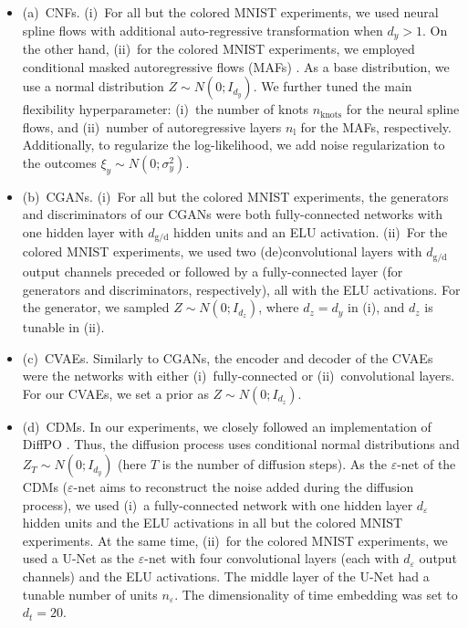 \documentclass[dvipsnames]{article} %
\begin{document}
\begin{itemize}
    \item (a)~CNFs. (i)~For all but the colored MNIST experiments, we used neural spline flows \citep{durkan2019neural} with additional auto-regressive transformation \citep{huang2018neural} when $d_y > 1$. {On the other hand, (ii)~for the colored MNIST experiments, we employed conditional masked autoregressive flows (MAFs) \citep{germain2015made,papamakarios2017masked}.} As a base distribution, we use a normal distribution $Z \sim N(0; I_{d_y})$. We further tuned the main flexibility hyperparameter: (i)~the number of knots $n_{\text{knots}}$ for the neural spline flows, and (ii)~number of autoregressive layers $n_{\text{l}}$ for the MAFs, respectively. Additionally, to regularize the log-likelihood, we add noise regularization \citep{rothfuss2019noise}  to the outcomes $\xi_y \sim N(0; \sigma^2_y)$.
    \item (b)~CGANs. (i)~For all but the colored MNIST experiments, the generators and discriminators of our CGANs were both fully-connected networks with one hidden layer with $d_{\text{g/d}}$ hidden units and an ELU activation. {(ii)~For the colored MNIST experiments, we used two (de)convolutional layers with $d_{\text{g/d}}$ output channels preceded or followed by a fully-connected layer (for generators and discriminators, respectively), all with the ELU activations.} For the generator, we sampled $Z \sim N(0; I_{d_z})$, where $d_z=d_y$ in (i), and $d_z$ is tunable in (ii).
    \item (c)~CVAEs. Similarly to CGANs, the encoder and decoder of the CVAEs were the networks with either (i)~fully-connected or (ii)~convolutional layers. For our CVAEs, we set a prior as $Z \sim N(0; I_{d_z})$.
    \item (d)~CDMs. In our experiments, we closely followed an implementation of DiffPO \citep{ma2024diffpo}. Thus, the diffusion process uses conditional normal distributions and $Z_T \sim N(0; I_{d_y})$ (here $T$ is the number of diffusion steps). As the $\varepsilon$-net of the CDMs ($\varepsilon$-net aims to reconstruct the noise added during the diffusion process), we used (i)~a fully-connected network with one hidden layer $d_\varepsilon$ hidden units and the ELU activations in all but the colored MNIST experiments. {At the same time, (ii)~for the colored MNIST experiments, we used a U-Net \citep{ronneberger2015u} as the $\varepsilon$-net with four convolutional layers (each with $d_\varepsilon$ output channels) and the ELU activations. The middle layer of the U-Net had a tunable number of units $n_\varepsilon$.} The dimensionality of time embedding was set to $d_t=20$. 
\end{itemize}
\end{document}
